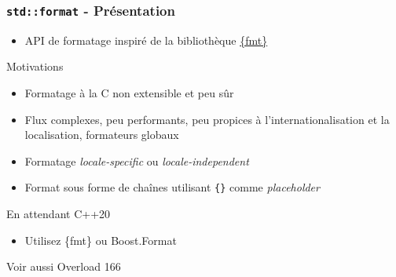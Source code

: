 \documentclass[C++.tex]{subfiles}
\begin{document}
\begin{frame}[fragile]
	\frametitle{\lstinline|std::format| - Présentation}
	\begin{itemize}
		\item API de formatage inspiré de la bibliothèque \href{https://github.com/fmtlib/fmt}{\{fmt\}}
	\end{itemize}

	\begin{block}{Motivations}
		\begin{itemize}
			\item Formatage \og à la C\fg{} non extensible et peu sûr


			\item Flux complexes, peu performants, peu propices à l'internationalisation et la localisation, formateurs globaux

		\end{itemize}
	\end{block}

	\begin{itemize}
		\item Formatage \textit{locale-specific} ou \textit{locale-independent}


		\item Format sous forme de chaînes utilisant \lstinline|{}| comme \textit{placeholder}
	\end{itemize}

	\begin{block}{En attendant C++20}
		\begin{itemize}
			\item Utilisez \{fmt\} ou Boost.Format
		\end{itemize}
	\end{block}

	\begin{block}{Voir aussi}
		Overload 166
	\end{block}
\end{frame}
\end{document}
